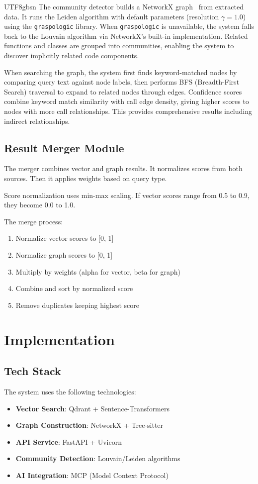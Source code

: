 \documentclass[11pt]{article}
\begin{document}
\begin{CJK*}{UTF8}{gbsn}
The community detector builds a NetworkX graph~\cite{networkx2024} from extracted data. It runs the Leiden algorithm with default parameters (resolution $\gamma=1.0$) using the \texttt{graspologic} library. When \texttt{graspologic} is unavailable, the system falls back to the Louvain algorithm via NetworkX's built-in implementation. Related functions and classes are grouped into communities, enabling the system to discover implicitly related code components.

When searching the graph, the system first finds keyword-matched nodes by comparing query text against node labels, then performs BFS (Breadth-First Search) traversal to expand to related nodes through edges. Confidence scores combine keyword match similarity with call edge density, giving higher scores to nodes with more call relationships. This provides comprehensive results including indirect relationships.

\subsection{Result Merger Module}
The merger combines vector and graph results. It normalizes scores from both sources. Then it applies weights based on query type.

Score normalization uses min-max scaling. If vector scores range from 0.5 to 0.9, they become 0.0 to 1.0.

The merge process:
\begin{enumerate}
    \item Normalize vector scores to [0, 1]
    \item Normalize graph scores to [0, 1]
    \item Multiply by weights (alpha for vector, beta for graph)
    \item Combine and sort by normalized score
    \item Remove duplicates keeping highest score
\end{enumerate}

\section{Implementation}

\subsection{Tech Stack}
The system uses the following technologies:

\begin{itemize}
    \item \textbf{Vector Search}: Qdrant + Sentence-Transformers
    \item \textbf{Graph Construction}: NetworkX + Tree-sitter
    \item \textbf{API Service}: FastAPI + Uvicorn
    \item \textbf{Community Detection}: Louvain/Leiden algorithms
    \item \textbf{AI Integration}: MCP (Model Context Protocol)
\end{itemize}


\end{CJK*}
\end{document}
